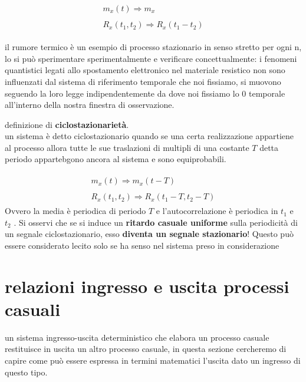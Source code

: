 \documentclass{article}
\begin{document}
\begin{equation}
\begin{split}
\begin{flalign}
m_x(t) \Rightarrow m_x
\end{flalign}
\\
\begin{flalign}
R_x(t_1,t_2) \Rightarrow R_x(t_1-t_2)
\end{flalign}
\end{split}
\end{equation}

il rumore termico è un esempio di processo stazionario in senso stretto per ogni
n, lo si può sperimentare sperimentalmente e verificare concettualmente: i fenomeni
quantistici legati allo spostamento elettronico nel materiale resistico non sono
influenzati dal sistema di riferimento temporale che noi fissiamo, si muovono
seguendo la loro legge indipendentemente da dove noi fissiamo lo $0$ temporale all'interno
della nostra finestra di osservazione.

definizione di \textbf{ciclostazionarietà}.\\
un sistema è detto ciclostazionario quando se una certa realizzazione appartiene
al processo allora tutte le sue traslazioni di multipli di una costante $T$ detta
periodo appartebgono ancora al sistema e sono equiprobabili.

\begin{equation}
\begin{split}
\begin{flalign}
m_x(t) \Rightarrow m_x(t-T)
\end{flalign}
\\
\begin{flalign}
R_x(t_1,t_2) \Rightarrow R_x(t_1 - T,t_2 - T)
\end{flalign}
\end{split}
\end{equation}
Ovvero la media è periodica di periodo $T$ e l'autocorrelazione
è periodica in $t_1$ e $t_2$ . Si osservi che se si induce un \textbf{ritardo
casuale uniforme} sulla periodicità di un segnale ciclostazionario, esso
\textbf{diventa un segnale stazionario}! Questo può essere considerato
lecito solo se ha senso nel sistema preso in considerazione


\section{relazioni ingresso e uscita processi casuali}
un sistema ingresso-uscita deterministico che elabora un processo casuale restituisce in uscita
un altro processo casuale, in questa sezione cercheremo di capire come può essere
espressa in termini matematici l'uscita dato un ingresso di questo tipo.
\end{document}
